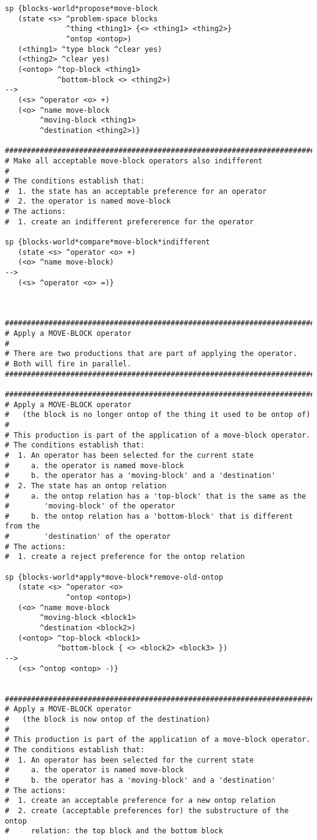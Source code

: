 \begin{verbatim}
sp {blocks-world*propose*move-block
   (state <s> ^problem-space blocks
              ^thing <thing1> {<> <thing1> <thing2>}
              ^ontop <ontop>)
   (<thing1> ^type block ^clear yes)
   (<thing2> ^clear yes)
   (<ontop> ^top-block <thing1>
            ^bottom-block <> <thing2>)
-->
   (<s> ^operator <o> +)
   (<o> ^name move-block
        ^moving-block <thing1>
        ^destination <thing2>)}

###############################################################################
# Make all acceptable move-block operators also indifferent
#
# The conditions establish that:
#  1. the state has an acceptable preference for an operator
#  2. the operator is named move-block
# The actions:
#  1. create an indifferent prefererence for the operator

sp {blocks-world*compare*move-block*indifferent
   (state <s> ^operator <o> +)
   (<o> ^name move-block)
-->
   (<s> ^operator <o> =)}



###############################################################################
# Apply a MOVE-BLOCK operator
# 
# There are two productions that are part of applying the operator.
# Both will fire in parallel.
###############################################################################

###############################################################################
# Apply a MOVE-BLOCK operator
#   (the block is no longer ontop of the thing it used to be ontop of)
#
# This production is part of the application of a move-block operator.
# The conditions establish that:
#  1. An operator has been selected for the current state
#     a. the operator is named move-block
#     b. the operator has a 'moving-block' and a 'destination'
#  2. The state has an ontop relation
#     a. the ontop relation has a 'top-block' that is the same as the
#        'moving-block' of the operator
#     b. the ontop relation has a 'bottom-block' that is different from the 
#        'destination' of the operator
# The actions:
#  1. create a reject preference for the ontop relation

sp {blocks-world*apply*move-block*remove-old-ontop
   (state <s> ^operator <o>
              ^ontop <ontop>)
   (<o> ^name move-block 
        ^moving-block <block1> 
        ^destination <block2>)
   (<ontop> ^top-block <block1> 
            ^bottom-block { <> <block2> <block3> })
-->
   (<s> ^ontop <ontop> -)}
 

###############################################################################
# Apply a MOVE-BLOCK operator
#   (the block is now ontop of the destination)
#
# This production is part of the application of a move-block operator.
# The conditions establish that:
#  1. An operator has been selected for the current state
#     a. the operator is named move-block
#     b. the operator has a 'moving-block' and a 'destination'
# The actions:
#  1. create an acceptable preference for a new ontop relation
#  2. create (acceptable preferences for) the substructure of the ontop
#     relation: the top block and the bottom block


\end{verbatim}
